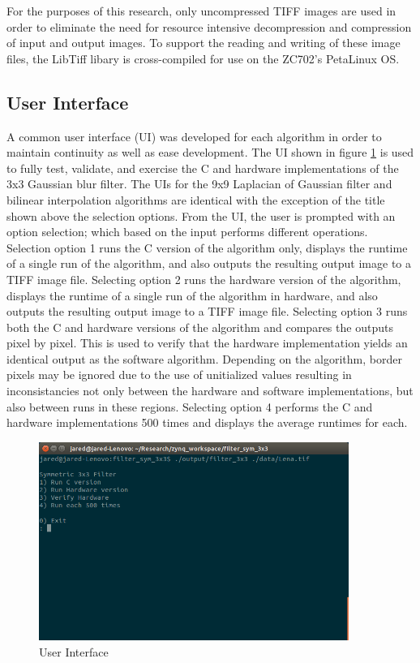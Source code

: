 For the purposes of this research, only uncompressed TIFF images are used in order to eliminate the need for resource intensive decompression and compression of input and output images.  To support the reading and writing of these image files, the LibTiff libary is cross-compiled for use on the ZC702's PetaLinux OS. 

\subsection{User Interface}
A common user interface (UI) was developed for each algorithm in order to maintain continuity as well as ease development.  The UI shown in figure \ref{fig:ui} is used to fully test, validate, and exercise the C and hardware implementations of the 3x3 Gaussian blur filter.  The UIs for the 9x9 Laplacian of Gaussian filter and bilinear interpolation algorithms are identical with the exception of the title shown above the selection options.  From the UI, the user is prompted with an option selection; which based on the input performs different operations.  Selection option 1 runs the C version of the algorithm only, displays the runtime of a single run of the algorithm, and also outputs the resulting output image to a TIFF image file.  Selecting option 2 runs the hardware version of the algorithm, displays the runtime of a single run of the algorithm in hardware, and also outputs the resulting output image to a TIFF image file.  Selecting option 3 runs both the C and hardware versions of the algorithm and compares the outputs pixel by pixel.  This is used to verify that the hardware implementation yields an identical output as the software algorithm.  Depending on the algorithm, border pixels may be ignored due to the use of unitialized values resulting in inconsistancies not only between the hardware and software implementations, but also between runs in these regions.  Selecting option 4 performs the C and hardware implementations 500 times and displays the average runtimes for each.

\begin{figure}[t]
  \centering
  \includegraphics[width=0.9\textwidth]{./img/research_ui.png}
  \caption{User Interface}
  \label{fig:ui}
\end{figure}

